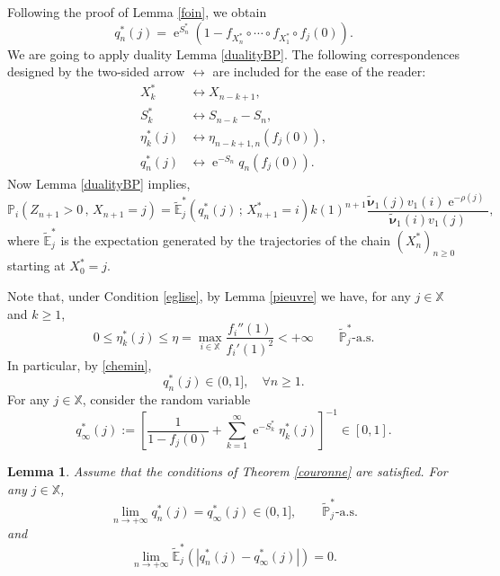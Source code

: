 \documentclass[12pt]{amsart}
\newtheorem{lemma}[theorem]{Lemma}
\theoremstyle{definition}
\numberwithin{equation}{section}
\newcommand*{\abs}[1]{\left\lvert#1\right\rvert}
\def\bb#1{\mathbb{#1}}
\def\tbs#1{\tilde{\boldsymbol{#1}}}
\def\tbb#1{\tilde{\mathbb{#1}}}
\def\geq{\geqslant}
\def\leq{\leqslant}
\DeclareMathOperator{\e}{e}
\begin{document}
Following the proof of Lemma \ref{foin}, we obtain
\begin{equation}
\label{cheminbis}
q_n^*(j) = \e^{S_n^*} \left( 1-f_{X_n^*} \circ \cdots \circ f_{X_1^*} \circ f_j (0) \right).
\end{equation}
We are going to apply duality Lemma \ref{dualityBP}. 
The following 
correspondences designed by the two-sided arrow $\longleftrightarrow$ are included for the ease of the reader:
\begin{align*}
X_k^* &\longleftrightarrow X_{n-k+1}, \\
S_k^* &  \longleftrightarrow S_{n-k}-S_n, \\
\eta_k^*(j) & \longleftrightarrow \eta_{n-k+1,n}\left( f_j (0) \right),\\
q_n^*(j) & \longleftrightarrow \e^{-S_n}q_{n}\left( f_j (0) \right).
\end{align*}
Now Lemma \ref{dualityBP} implies,
\begin{equation}
\label{coleoptere}
\bb P_i \left( Z_{n+1} > 0 \,,\, X_{n+1} = j \right) = \tbb E_j^* \left( q_n^*(j) \,;\, X_{n+1}^* = i \right) k(1)^{n+1} \frac{\tbs \nu_1(j) v_1(i) \e^{-\rho(j)}}{\tbs \nu_1(i) v_1(j)},
\end{equation}
where $\tbb E_j^*$ is the expectation generated by the trajectories of the chain $\left( X_n^* \right)_{n\geq 0}$ starting at $X_0^* = j$. 

Note that, under Condition \ref{eglise},  by Lemma \ref{pieuvre} we have, for any $j \in \bb X$ and $k \geq 1$,
\begin{equation}
0 \leq \eta_k^*(j) \leq \eta = \max_{i \in \bb X} \frac{f_i''(1)}{f_i'(1)^2} < +\infty \qquad \tbb P_j^*\text{-a.s.}
\label{ehtabound001}
\end{equation}
 In particular, by \eqref{chemin}, 
\[
q_n^*(j) \in (0,1], \quad \forall n \geq 1.
\]
For any $j \in \bb X$, consider the random variable
\begin{equation}
\label{potion002}
q_{\infty}^*(j) := \left[ \frac{1}{1-f_j(0)} + \sum_{k=1}^{\infty} \e^{-S_k^*} \eta_k^*(j) \right]^{-1} \in [0,1].
\end{equation}

\begin{lemma} Assume that the conditions of Theorem \ref{couronne} are satisfied.
For any $j \in \bb X$,
\begin{equation}
	\label{dino001}
	\lim_{n\to+\infty} q_n^*(j) = q_{\infty}^*(j) \in (0,1], \qquad \tbb P_j^*\text{-a.s.}
\end{equation}
and
\begin{equation}
	\label{dino002}
	\lim_{n\to+\infty} \tbb E_j^* \left( \abs{q_n^*(j) - q_{\infty}^*(j)} \right) = 0.
\end{equation}
\end{lemma}
\end{document}
